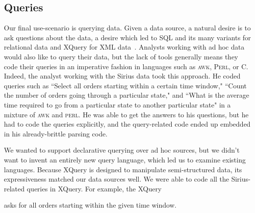 \documentclass{sigplanconf}
\newcommand{\dibbler}{Sirius}
\newcommand{\C}{\textsc{C}}
\newcommand{\perl}{\textsc{Perl}}
\begin{document}
\subsection{Queries}
Our final use-scenario is querying data.
Given a data source, a natural desire is to ask questions about the data, a desire which led to SQL and its many variants for relational data and XQuery for XML data~\cite{boag03XQueryDraft}.  Analysts working with ad hoc data would also like to query their
data, but the lack of tools generally means they code their queries in an imperative fashion in languages such as \textsc{awk}, \perl{}, or \C{}.
Indeed, the analyst working with the \dibbler{} data took this approach.
He coded queries such as ``Select all orders starting within a certain time window," ``Count the number of orders going through a particular state," and ``What is the average time required to go from a particular state to another
particular state" in a mixture of \textsc{awk} and \textsc{perl}.  He was
able to get the answers to his questions, but he had to code the queries explicitly, and the query-related code ended up embedded in his already-brittle parsing code.

We wanted to support declarative querying over ad hoc sources, but we didn't want to invent an entirely new query language, which led us to examine existing languages.  Because XQuery is designed to manipulate semi-structured data, its expressiveness matched our data sources well.  We were able to code all the \dibbler{}-related queries in XQuery.  For example, the XQuery
\begin{code}
\end{code}
asks for all orders starting within the given time window.  
\end{document}
